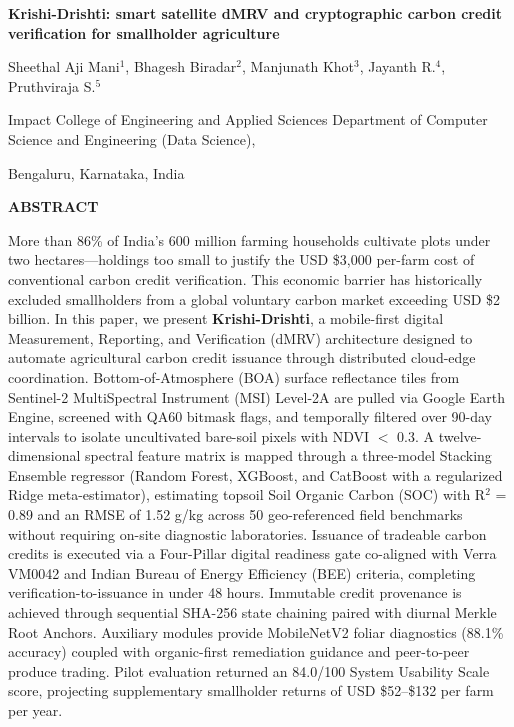 \documentclass[11pt,a4paper]{article}
\begin{document}
\begin{center}
    {\Large \textbf{Krishi-Drishti: smart satellite dMRV and cryptographic carbon credit verification for smallholder agriculture}\par}
    \vspace{0.8em}
    {\normalsize Sheethal Aji Mani$^1$, Bhagesh Biradar$^2$, Manjunath Khot$^3$, Jayanth R.$^4$, Pruthviraja S.$^5$\par}
    \vspace{0.4em}
    {\small Impact College of Engineering and Applied Sciences Department of Computer Science and Engineering (Data Science),\par
    Bengaluru, Karnataka, India\par}
\end{center}
\vspace{1.2em}

\begin{center}
    \textbf{ABSTRACT}
\end{center}
\noindent More than 86\% of India's 600 million farming households cultivate plots under two hectares---holdings too small to justify the USD \$3,000 per-farm cost of conventional carbon credit verification. This economic barrier has historically excluded smallholders from a global voluntary carbon market exceeding USD \$2 billion. In this paper, we present \textbf{Krishi-Drishti}, a mobile-first digital Measurement, Reporting, and Verification (dMRV) architecture designed to automate agricultural carbon credit issuance through distributed cloud-edge coordination. Bottom-of-Atmosphere (BOA) surface reflectance tiles from Sentinel-2 MultiSpectral Instrument (MSI) Level-2A are pulled via Google Earth Engine, screened with QA60 bitmask flags, and temporally filtered over 90-day intervals to isolate uncultivated bare-soil pixels with NDVI $<$ 0.3. A twelve-dimensional spectral feature matrix is mapped through a three-model Stacking Ensemble regressor (Random Forest, XGBoost, and CatBoost with a regularized Ridge meta-estimator), estimating topsoil Soil Organic Carbon (SOC) with R$^2$ = 0.89 and an RMSE of 1.52 g/kg across 50 geo-referenced field benchmarks without requiring on-site diagnostic laboratories. Issuance of tradeable carbon credits is executed via a Four-Pillar digital readiness gate co-aligned with Verra VM0042 and Indian Bureau of Energy Efficiency (BEE) criteria, completing verification-to-issuance in under 48 hours. Immutable credit provenance is achieved through sequential SHA-256 state chaining paired with diurnal Merkle Root Anchors. Auxiliary modules provide MobileNetV2 foliar diagnostics (88.1\% accuracy) coupled with organic-first remediation guidance and peer-to-peer produce trading. Pilot evaluation returned an 84.0/100 System Usability Scale score, projecting supplementary smallholder returns of USD \$52--\$132 per farm per year.
\vspace{0.8em}
\end{document}
